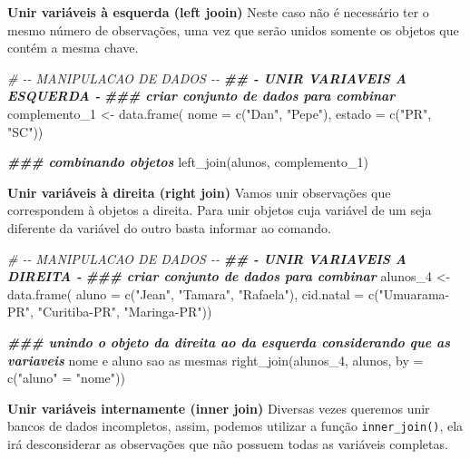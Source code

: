 \documentclass[
]{book}
\newenvironment{Shaded}{\begin{snugshade}}{\end{snugshade}}
\newcommand{\AttributeTok}[1]{\textcolor[rgb]{0.77,0.63,0.00}{#1}}
\newcommand{\CommentTok}[1]{\textcolor[rgb]{0.56,0.35,0.01}{\textit{#1}}}
\newcommand{\DocumentationTok}[1]{\textcolor[rgb]{0.56,0.35,0.01}{\textbf{\textit{#1}}}}
\newcommand{\FunctionTok}[1]{\textcolor[rgb]{0.00,0.00,0.00}{#1}}
\newcommand{\NormalTok}[1]{#1}
\newcommand{\OtherTok}[1]{\textcolor[rgb]{0.56,0.35,0.01}{#1}}
\newcommand{\StringTok}[1]{\textcolor[rgb]{0.31,0.60,0.02}{#1}}
\begin{document}
\textbf{Unir variáveis à esquerda (left jooin)}
Neste caso não é necessário ter o mesmo número de observações, uma vez que serão unidos somente os objetos que contém a mesma chave.

\begin{Shaded}
\begin{Highlighting}[]
\CommentTok{\# {-}{-} MANIPULACAO DE DADOS {-}{-}}
\DocumentationTok{\#\# {-} UNIR VARIAVEIS A ESQUERDA {-}}
\DocumentationTok{\#\#\# criar conjunto de dados para combinar}
\NormalTok{complemento\_1 }\OtherTok{\textless{}{-}} \FunctionTok{data.frame}\NormalTok{(}
  \AttributeTok{nome =} \FunctionTok{c}\NormalTok{(}\StringTok{"Dan"}\NormalTok{, }\StringTok{"Pepe"}\NormalTok{),}
  \AttributeTok{estado =} \FunctionTok{c}\NormalTok{(}\StringTok{"PR"}\NormalTok{, }\StringTok{"SC"}\NormalTok{))}

\DocumentationTok{\#\#\# combinando objetos}
\FunctionTok{left\_join}\NormalTok{(alunos, complemento\_1)}
\end{Highlighting}
\end{Shaded}

\textbf{Unir variáveis à direita (right join)}
Vamos unir observações que correspondem à objetos a direita. Para unir objetos cuja variável de um seja diferente da variável do outro basta informar ao comando.

\begin{Shaded}
\begin{Highlighting}[]
\CommentTok{\# {-}{-} MANIPULACAO DE DADOS {-}{-}}
\DocumentationTok{\#\# {-} UNIR VARIAVEIS A DIREITA {-}}
\DocumentationTok{\#\#\# criar conjunto de dados para combinar}
\NormalTok{alunos\_4 }\OtherTok{\textless{}{-}} \FunctionTok{data.frame}\NormalTok{(}
  \AttributeTok{aluno =} \FunctionTok{c}\NormalTok{(}\StringTok{"Jean"}\NormalTok{, }\StringTok{"Tamara"}\NormalTok{, }\StringTok{"Rafaela"}\NormalTok{),}
  \AttributeTok{cid.natal =} \FunctionTok{c}\NormalTok{(}\StringTok{"Umuarama{-}PR"}\NormalTok{, }\StringTok{"Curitiba{-}PR"}\NormalTok{, }\StringTok{"Maringa{-}PR"}\NormalTok{))}

\DocumentationTok{\#\#\# unindo o objeto da direita ao da esquerda considerando que as variaveis}
\NormalTok{nome e aluno sao as mesmas}
\FunctionTok{right\_join}\NormalTok{(alunos\_4, alunos, }\AttributeTok{by =} \FunctionTok{c}\NormalTok{(}\StringTok{"aluno"} \OtherTok{=} \StringTok{"nome"}\NormalTok{))}
\end{Highlighting}
\end{Shaded}

\textbf{Unir variáveis internamente (inner join)}
Diversas vezes queremos unir bancos de dados incompletos, assim, podemos utilizar a função \texttt{inner\_join()}, ela irá desconsiderar as observações que não possuem todas as variáveis completas.
\end{document}
